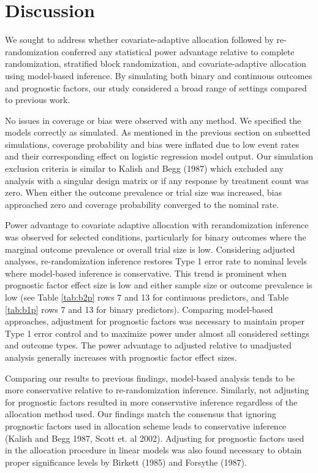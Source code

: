 \section{Discussion}
We sought to address whether covariate-adaptive allocation followed by re-randomization conferred any statistical power advantage relative to complete randomization, stratified block randomization, and covariate-adaptive allocation using model-based inference.
By simulating both binary and continuous outcomes and prognostic factors, our study considered a broad range of settings compared to previous work.

No issues in coverage or bias were observed with any method. 
We specified the models correctly as simulated. 
As mentioned in the previous section on subsetted simulations, coverage probability and bias were inflated due to low event rates and their corresponding effect on logistic regression model output.
Our simulation exclusion criteria is similar to Kalish and Begg (1987) which excluded any analysis with a singular design matrix or if any response by treatment count was zero.
When either the outcome prevalence or trial size was increased, bias approached zero and coverage probability converged to the nominal rate.

Power advantage to covariate adaptive allocation with rerandomization inference was observed for selected conditions, particularly for binary outcomes where the marginal outcome prevalence or overall trial size is low. 
Considering adjusted analyses, re-randomization inference restores Type 1 error rate to nominal levels where model-based inference is conservative.
This trend is prominent when prognostic factor effect size is low and either sample size or outcome prevalence is low (see Table \ref{tab:b2p} rows 7 and 13 for continuous predictors, and Table \ref{tab:b1p} rows 7 and 13 for binary predictors).
Comparing model-based approaches, adjustment for prognostic factors was necessary to maintain proper Type 1 error control and to maximize power under almost all considered settings and outcome types.
The power advantage to adjusted relative to unadjusted analysis generally increases with prognostic factor effect sizes. 

Comparing our results to previous findings, model-based analysis tends to be more conservative relative to re-randomization inference.
Similarly, not adjusting for prognostic factors resulted in more conservative inference regardless of the allocation method used.  
Our findings match the consensus that ignoring prognostic factors used in allocation scheme leads to conservative inference (Kalish and Begg 1987, Scott et. al 2002).
Adjusting for prognostic factors used in the allocation procedure in linear models was also found necessary to obtain proper significance levels by Birkett (1985) and Forsythe (1987).

